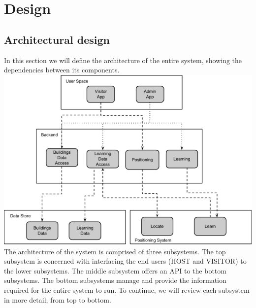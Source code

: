 \chapter{Design}
\section{Architectural design}
In this section we will define the architecture of the entire system, showing the dependencies between its components.
\\
\includegraphics[scale=0.5]{ArchitectureDiagram.png}
\\
The architecture of the system is comprised of three subsystems. The top subsystem is concerned with interfacing the end users (HOST and VISITOR) to the lower subsystems. The middle subsystem offers an API to the bottom subsystems. The bottom subsystems manage and provide the information required for the entire system to run. To continue, we will review each subsystem in more detail, from top to bottom.

